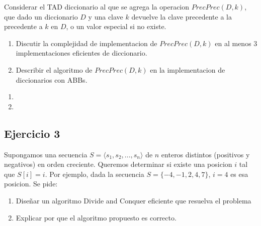 \documentclass[10pt, a4paper]{report}
\begin{document}
Considerar el TAD diccionario al que se agrega la operacion $PrecPrec(D,k)$, que dado un diccionario $D$ y una clave $k$ devuelve la clave precedente a la precedente a $k$ en $D$, o un valor especial si no existe.
\begin{enumerate}
 \item Discutir la complejidad de implementacion de $PrecPrec(D,k)$ en al menos $3$ implementaciones eficientes de diccionario.
 \item Describir el algoritmo de $PrecPrec(D,k)$ en la implementacion de diccionarios con ABBs.
\end{enumerate}

\begin{enumerate}
 \item 
 \item
\end{enumerate}


\subsection*{Ejercicio 3}

Supongamos una secuencia $S = \langle s_1, s_2, ..., s_n \rangle$ de $n$ enteros distintos (positivos y negativos) en orden creciente. Queremos determinar si existe una posicion $i$ tal que $S[i]=i$. Por ejemplo, dada la secuencia $S = \{-4,-1,2,4,7\}$, $i=4$ es esa posicion. Se pide:
\begin{enumerate}
 \item Dise\~nar un algoritmo Divide and Conquer eficiente que resuelva el problema
 \item Explicar por que el algoritmo propuesto es correcto.
\end{enumerate}
\end{document}
